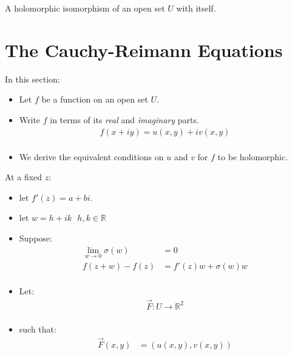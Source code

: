 \begin{defn}
	A holomorphic isomorphism of an open set $U$ with itself.
\end{defn}

\section{The Cauchy-Reimann Equations}
In this section:
\begin{itemize}
	\item Let $f$ be a function on an open set $U.$
	\item Write $f$ in terms of its \textit{real} and \textit{imaginary} parts.
	\begin{align*}
		f(x + iy) = u(x, y) + iv(x, y) \\
	\end{align*}
	\item We derive the equivalent conditions on $u$ and $v$ for $f$ to be holomorphic.
\end{itemize}

At a fixed $z$: 
\begin{itemize}
	\item let $f'(z) = a + bi.$ \\
	\item let $w = h + ik \,\,\,\, h, k \in \mathbb{R}$
	\item Suppose:
	\begin{align*}
		\lim_{w \to 0} \sigma(w) &= 0 \\
		f(z + w) - f(z) &= f'(z)w + \sigma(w)w \\
	\end{align*}
	\item Let:
	\begin{align*}
		\vec{F}: U \to \mathbb{R}^2 \\
	\end{align*}
	\item such that:
	\begin{align*}
		\vec{F}(x, y) &= (u(x, y), v(x, y))
	\end{align*}
\end{itemize}

